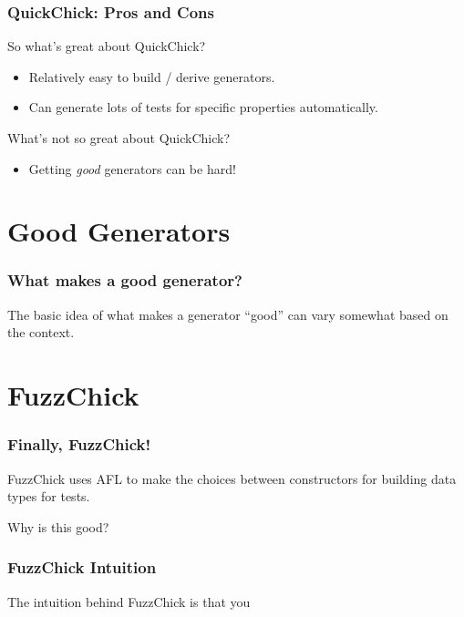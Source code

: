 \documentclass{beamer}
\begin{document}
\begin{frame}
  \frametitle{QuickChick: Pros and Cons}

  So what's great about QuickChick?\\

  \begin{itemize}
  \item Relatively easy to build / derive generators.
  \item Can generate lots of tests for specific properties
    automatically.
  \end{itemize}

  \pause

  What's not so great about QuickChick?\\

  \pause

  \begin{itemize}
  \item Getting \emph{good} generators can be hard!
  \end{itemize}
\end{frame}

\section{Good Generators}

\begin{frame}
  \frametitle{What makes a good generator?}

  The basic idea of what makes a generator ``good'' can vary somewhat
  based on the context.\cite{lampropoulosgenerating}
\end{frame}

\section{FuzzChick}

\begin{frame}
  \frametitle{Finally, FuzzChick!}

  FuzzChick uses AFL to make the choices between constructors for
  building data types for tests.\\

  \pause

  Why is this good? \\

\end{frame}

\begin{frame}
  \frametitle{FuzzChick Intuition}

  The intuition behind FuzzChick is that you
\end{frame}
\end{document}
